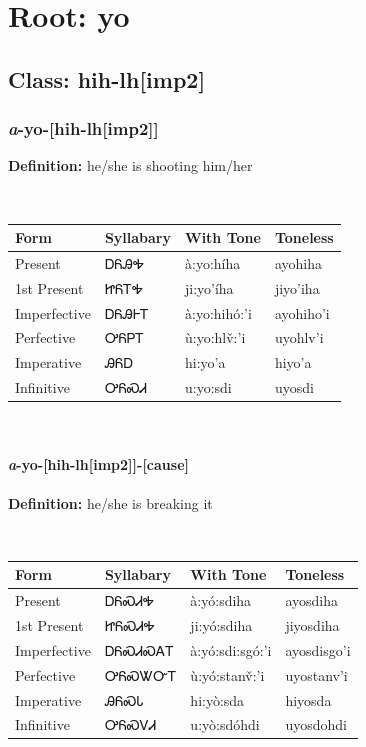 \needspace{4in}
\section*{Root: yo}
\nopagebreak
{}
\needspace{3in}
\subsection*{Class: hih-lh[imp2]}
\nopagebreak
\needspace{2in}
\subsubsection*{\textit{a}{-}\textbf{yo}{-}[hih-lh[imp2]]}
\nopagebreak
\textbf{Definition: } he/she is shooting him/her
\\[0.5em]
\begin{tabularx}{\textwidth}{l X X X}%
\toprule%
\textbf{Form}&\textbf{Syllabary}&\textbf{With Tone}&\textbf{Toneless}\\%
\midrule%
Present&ᎠᏲᎯᎭ&à:yo:híha&ayohiha\\%
1st Present&ᏥᏲᎢᎭ&ji:yo’íha&jiyo’iha\\%
Imperfective&ᎠᏲᎯᎰᎢ&à:yo:hihó:’i&ayohiho’i\\%
Perfective&ᎤᏲᏢᎢ&ù:yo:hlv̌:’i&uyohlv’i\\%
Imperative&ᎯᏲᎠ&hi:yo’a&hiyo’a\\%
Infinitive&ᎤᏲᏍᏗ&u:yo:sdi&uyosdi\\%
\bottomrule%
\end{tabularx}
\\[1em]
\needspace{1in}
\paragraph*{\textit{a}{-}\textbf{yo}{-}[hih-lh[imp2]]{-}[cause]}
\nopagebreak
\textbf{Definition: } he/she is breaking it
\\[0.5em]
\begin{tabularx}{\textwidth}{l X X X}%
\toprule%
\textbf{Form}&\textbf{Syllabary}&\textbf{With Tone}&\textbf{Toneless}\\%
\midrule%
Present&ᎠᏲᏍᏗᎭ&à:yó:sdiha&ayosdiha\\%
1st Present&ᏥᏲᏍᏗᎭ&ji:yó:sdiha&jiyosdiha\\%
Imperfective&ᎠᏲᏍᏗᏍᎪᎢ&à:yó:sdi:sgó:’i&ayosdisgo’i\\%
Perfective&ᎤᏲᏍᏔᏅᎢ&ù:yó:stanv̌:’i&uyostanv’i\\%
Imperative&ᎯᏲᏍᏓ&hi:yò:sda&hiyosda\\%
Infinitive&ᎤᏲᏍᏙᏗ&u:yò:sdóhdi&uyosdohdi\\%
\bottomrule%
\end{tabularx}
\\[1em]
\needspace{1in}
